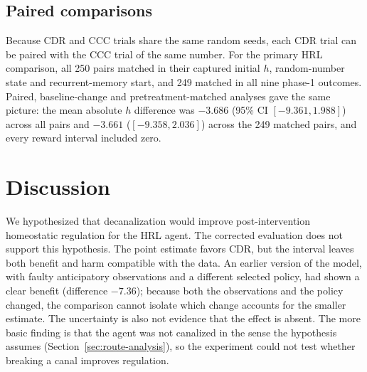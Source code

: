 \documentclass[12pt,fleqn]{article}
\begin{document}
\subsection{Paired comparisons}

Because CDR and CCC trials share the same random seeds, each CDR trial can be paired with the CCC trial of the same number. For the primary HRL comparison, all 250 pairs matched in their captured initial $h$, random-number state and recurrent-memory start, and 249 matched in all nine phase-1 outcomes. Paired, baseline-change and pretreatment-matched analyses gave the same picture: the mean absolute $h$ difference was $-3.686$ (95\% CI $[-9.361, 1.988]$) across all pairs and $-3.661$ ($[-9.358, 2.036]$) across the 249 matched pairs, and every reward interval included zero.

\section{Discussion}\label{model-discussion}



We hypothesized that decanalization would improve post-intervention homeostatic regulation for the HRL agent. The corrected evaluation does not support this hypothesis. The point estimate favors CDR, but the interval leaves both benefit and harm compatible with the data. An earlier version of the model, with faulty anticipatory observations and a different selected policy, had shown a clear benefit (difference $-7.36$); because both the observations and the policy changed, the comparison cannot isolate which change accounts for the smaller estimate. The uncertainty is also not evidence that the effect is absent. The more basic finding is that the agent was not canalized in the sense the hypothesis assumes (Section~\ref{sec:route-analysis}), so the experiment could not test whether breaking a canal improves regulation.
\end{document}
